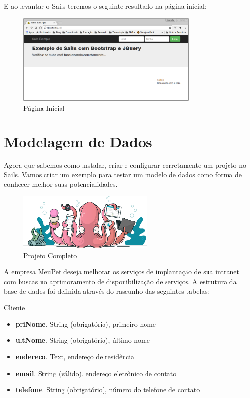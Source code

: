 \documentclass[a4paper,11pt]{article}
\begin{document}
E ao levantar o Sails teremos o seguinte resultado na página inicial:
\begin{figure}[H]
	\centering
	\includegraphics[width=0.8\textwidth]{imagens/sailsEx01.png}
	\caption{Página Inicial}
\end{figure}

\section{Modelagem de Dados}
Agora que sabemos como instalar, criar e configurar corretamente um projeto no
Sails. Vamos criar um exemplo para testar um modelo de dados como forma de conhecer melhor suas potencialidades.
\begin{figure}[H]
	\centering
	\includegraphics[width=0.6\textwidth]{imagens/hero_squid.png}
	\caption{Projeto Completo}
\end{figure}

A empresa MeuPet deseja melhorar os serviços de implantação de sua intranet 
com buscas no aprimoramento de disponibilização de serviços. A estrutura da 
base de dados foi definida através do rascunho das seguintes tabelas:

{\ttfamily Cliente} \vspace{-1em}
\begin{itemize}[nolistsep]
  \item \textbf{priNome}. String (obrigatório), primeiro nome
  \item \textbf{ultNome}. String (obrigatório), último nome
  \item \textbf{endereco}.  Text, endereço de residência
  \item \textbf{email}. String (válido), endereço eletrônico de contato
  \item \textbf{telefone}. String (obrigatório), número do telefone de contato
\end{itemize}
\end{document}
